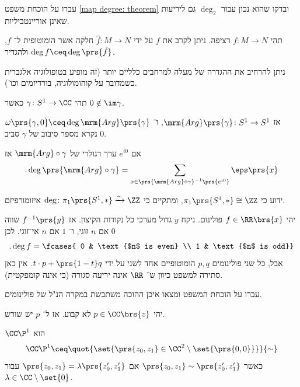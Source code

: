 \documentclass[a4paper,10pt,twoside,openany]{book}
\begin{document}
\begin{exercise}
עברו על הוכחת משפט
\ref{map degree: theorem}
ובדקו שהוא נכון עבור
$\deg_2$
גם ליריעות שאינן אוריינטביליות.
\end{exercise}

\begin{remark}
תהי
$f \colon M \to N$
רציפה. ניתן לקרב את
$f$
על ידי
$\hat{f} \colon M \to N$
חלקה אשר הומוטופית ל־%
$f$,
ולהגדיר
$\deg f \ceq \deg \prs{\hat{f}}$.

ניתן להרחיב את ההגדרה של מעלה למרחבים כלליים יותר
(זה מופיע בטופולוגיה אלגברית כשמדובר על קוהומולוגיה, בורדיזמים וכו').
\end{remark}

\begin{remark}
תהי
$\gamma \colon S^1 \to \CC$
כאשר
$0 \notin \im \gamma$.

אז
$\mrm{Arg}\prs{\gamma} \colon S^1 \to S^1$,
ו־%
$\omega\prs{\gamma,0} \ceq \deg\mrm{Arg}\prs{\gamma}$
נקרא מספר סיבוב של
$\gamma$
סביב
$0$.

אם
$e^{i0}$
ערך רגולרי של
$\mrm{Arg}\circ \gamma$
אז
\[\text{.}\deg\prs{\mrm{Arg}\circ \gamma} = \sum_{x \in \prs{\mrm{Arg} \circ \gamma}^{-1}\prs{e^{i0}}} \eps\prs{x}\]
\end{remark}
\begin{remark}
ידוע כי
$\pi_1\prs{S^1, *} \cong \ZZ$,
ומתקיים כי
$\deg \colon \pi_1\prs{S^1, *} \xrightarrow{\sim} \ZZ$
איזומורפיזם.
\end{remark}

\begin{remark}
יהי
$f \in \RR\brs{x}$
פולינום.
ניקח
$y$
גדול מערכי כל נקודות הקיצון.
אז
$f^{-1}\prs{y}$
שווה
$0$
אם
$n$
זוגי, ו־%
$1$
אם
$n$
אי־זוגי.
לכן
\[\text{.} \deg f = \fcases{ 0 & \text{$n$ is even} \\ 1 & \text{$n$ is odd}}\]
אבל, כל שני פולינומים
$p,q$
הומוטופיים אחד לשני על ידי
$t \cdot p + \prs{1-t}q$.
אין כאן סתירה למשפט כיוון ש־%
$\RR$
אינה יריעה סגורה (כי אינה קומפקטית).
\end{remark}
\begin{exercise}
עברו על הוכחת המשפט ומצאו איכן ההוכה משתבשת במקרה הנ"ל של פולינומים.
\end{exercise}

\begin{theorem} \label{fundamental theorem}
יהי
$p \in \CC\brs{z}$
לא קבוע. אז ל־%
$p$
יש שורש.
\end{theorem}

\begin{definition}
$\CC\P^1$
הוא
\[\CC\P^1 \ceq \quot{\set{\prs{z_0,z_1} \in \CC^2 \setminus \set{\prs{0,0}}}}{\sim}\]
כאשר
$\prs{z_0, z_1} \sim \prs{z_0', z_1'}$
אם
$\prs{z_0, z_1} = \lambda\prs{z_0', z_1'}$
עבור
$\lambda \in \CC \setminus \set{0}$.
\end{definition}
\end{document}
